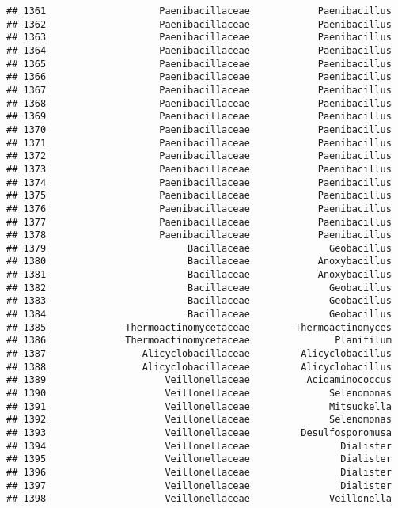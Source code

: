 \documentclass[
]{article}
\begin{document}
\begin{verbatim}
## 1361                    Paenibacillaceae            Paenibacillus
## 1362                    Paenibacillaceae            Paenibacillus
## 1363                    Paenibacillaceae            Paenibacillus
## 1364                    Paenibacillaceae            Paenibacillus
## 1365                    Paenibacillaceae            Paenibacillus
## 1366                    Paenibacillaceae            Paenibacillus
## 1367                    Paenibacillaceae            Paenibacillus
## 1368                    Paenibacillaceae            Paenibacillus
## 1369                    Paenibacillaceae            Paenibacillus
## 1370                    Paenibacillaceae            Paenibacillus
## 1371                    Paenibacillaceae            Paenibacillus
## 1372                    Paenibacillaceae            Paenibacillus
## 1373                    Paenibacillaceae            Paenibacillus
## 1374                    Paenibacillaceae            Paenibacillus
## 1375                    Paenibacillaceae            Paenibacillus
## 1376                    Paenibacillaceae            Paenibacillus
## 1377                    Paenibacillaceae            Paenibacillus
## 1378                    Paenibacillaceae            Paenibacillus
## 1379                         Bacillaceae              Geobacillus
## 1380                         Bacillaceae            Anoxybacillus
## 1381                         Bacillaceae            Anoxybacillus
## 1382                         Bacillaceae              Geobacillus
## 1383                         Bacillaceae              Geobacillus
## 1384                         Bacillaceae              Geobacillus
## 1385              Thermoactinomycetaceae        Thermoactinomyces
## 1386              Thermoactinomycetaceae               Planifilum
## 1387                 Alicyclobacillaceae         Alicyclobacillus
## 1388                 Alicyclobacillaceae         Alicyclobacillus
## 1389                     Veillonellaceae          Acidaminococcus
## 1390                     Veillonellaceae              Selenomonas
## 1391                     Veillonellaceae              Mitsuokella
## 1392                     Veillonellaceae              Selenomonas
## 1393                     Veillonellaceae         Desulfosporomusa
## 1394                     Veillonellaceae                Dialister
## 1395                     Veillonellaceae                Dialister
## 1396                     Veillonellaceae                Dialister
## 1397                     Veillonellaceae                Dialister
## 1398                     Veillonellaceae              Veillonella

\end{verbatim}
\end{document}

